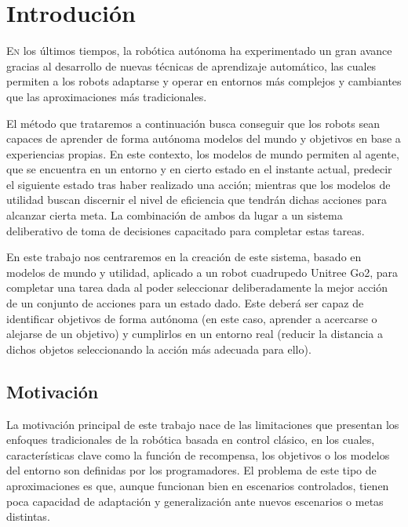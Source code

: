 \chapter{Introdución}
\label{chap:introducion}

\lettrine{E}n los últimos tiempos, la robótica autónoma ha experimentado un gran avance gracias 
al desarrollo de nuevas técnicas de aprendizaje automático, las cuales permiten a los robots 
adaptarse y operar en entornos más complejos y cambiantes que las aproximaciones más tradicionales.

El método que trataremos a continuación busca conseguir que los robots sean capaces de aprender 
de forma autónoma modelos del mundo y objetivos en base a experiencias propias. 
En este contexto, los modelos de mundo permiten al agente, que se encuentra en un entorno y en cierto estado 
en el instante actual, predecir el siguiente estado tras haber realizado 
una acción; mientras que los modelos de utilidad buscan discernir el nivel de eficiencia que 
tendrán dichas acciones para alcanzar cierta meta. La combinación de ambos da lugar a un sistema 
deliberativo de toma de decisiones capacitado para completar estas tareas.

En este trabajo nos centraremos en la creación de este sistema, basado en modelos de mundo 
y utilidad, aplicado a un robot cuadrupedo Unitree Go2\cite{UnitreeGo2Web}, para completar una tarea dada al 
poder seleccionar deliberadamente la mejor acción de un conjunto de acciones para un estado dado. Este deberá ser capaz de identificar 
objetivos de forma autónoma (en este caso, aprender a acercarse o alejarse de un objetivo) y cumplirlos en un 
entorno real (reducir la distancia a dichos objetos seleccionando la acción más adecuada para ello).

\section{Motivación}
\label{sec:motivacion}

La motivación principal de este trabajo nace de las limitaciones que presentan los enfoques tradicionales 
de la robótica basada en control clásico, en los cuales, características clave como la función de recompensa, los objetivos o 
los modelos del entorno son definidas por los programadores. El problema de este tipo de aproximaciones 
es que, aunque funcionan bien en escenarios controlados, tienen poca capacidad de adaptación y generalización 
ante nuevos escenarios o metas distintas.

